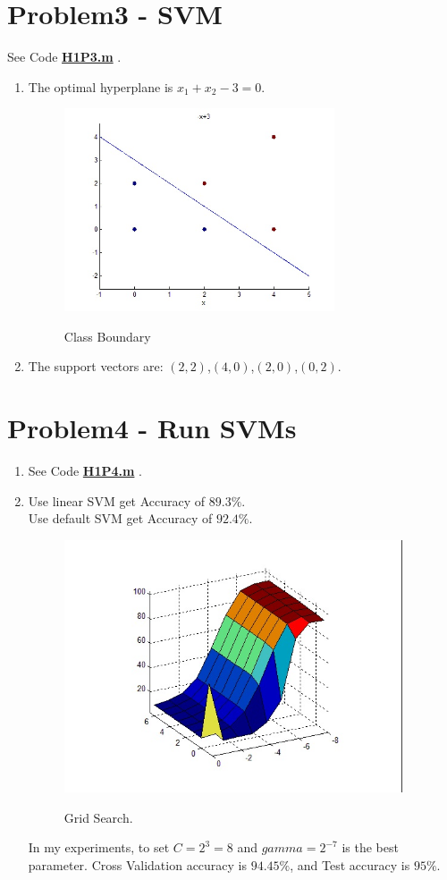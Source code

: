 \documentclass[12pt]{article}
\begin{document}
\section{Problem3 - SVM}
See Code \href{./H1P3.m}{\textbf{H1P3.m}} .
\begin{enumerate}
    \item The optimal hyperplane is $x_1+x_2-3=0$.
        \begin{figure}[H]
          \centering
          \includegraphics[width=8cm]{fig/3-1.jpg}\\
          \caption{Class Boundary}\label{fig1}
        \end{figure}
    \item The support vectors are: $(2,2)$,$(4,0)$,$(2,0)$,$(0,2)$.
    
\end{enumerate}

\section{Problem4 - Run SVMs}
\begin{enumerate}
    \item
    See Code \href{./H1P4.m}{\textbf{H1P4.m}} .
    \item
    Use linear SVM get Accuracy of $89.3\%$. \\
    Use default SVM get Accuracy of $92.4\%$. \\
    \begin{figure}[H]
       \centering
       \includegraphics[width=10cm]{fig/svm.jpg}\\
       \caption{Grid Search.}\label{fig1}
    \end{figure}
    In my experiments, to set $C=2^3=8$ and $gamma=2^{-7}$ is the best parameter. Cross Validation accuracy is $94.45\%$, and Test accuracy is $95\%$.

\end{enumerate}
\end{document}
